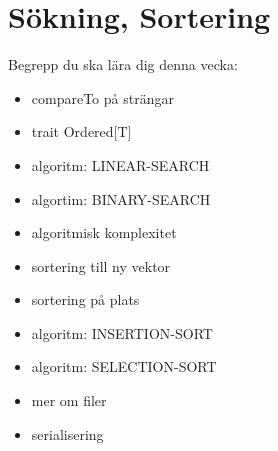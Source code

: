 \chapter{Sökning, Sortering}\label{chapter:W10}
Begrepp du ska lära dig denna vecka:
\begin{multicols}{2}\begin{itemize}[nosep,label={$\square$},leftmargin=*]
\item compareTo på strängar
\item trait Ordered[T]
\item algoritm: LINEAR-SEARCH
\item algortim: BINARY-SEARCH
\item algoritmisk komplexitet
\item sortering till ny vektor
\item sortering på plats
\item algoritm: INSERTION-SORT
\item algoritm: SELECTION-SORT
\item mer om filer
\item serialisering\end{itemize}\end{multicols}
